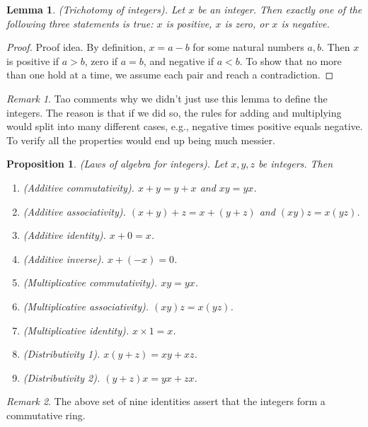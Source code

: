 \documentclass[12pt]{article}
\newtheorem{lemma}[theorem]{Lemma}
\newtheorem{proposition}[theorem]{Proposition}
\theoremstyle{definition}
\theoremstyle{remark}
\newtheorem*{remark}{Remark}
\begin{document}
\begin{lemma}
    (Trichotomy of integers). Let $x$ be an integer. Then exactly one of the following three statements is true: $x$ is positive, $x$ is zero, or $x$ is negative.
\end{lemma}

\begin{proof}
    Proof idea. By definition, $x = a-b$ for some natural numbers $a,b$. Then $x$ is positive if $a > b$, zero if $a = b$, and negative if $a < b$. To show that no more than one hold at a time, we assume each pair and reach a contradiction.
\end{proof}

\begin{remark}
    Tao comments why we didn't just use this lemma to define the integers. The reason is that if we did so, the rules for adding and multiplying would split into many different cases, e.g., negative times positive equals negative. To verify all the properties would end up being much messier.
\end{remark}

\begin{proposition}
    (Laws of algebra for integers). Let $x, y, z$ be integers. Then
    \begin{enumerate}
        \item (Additive commutativity). $x + y = y + x$ and $xy = yx$.
        \item (Additive associativity). $(x + y) + z = x + (y + z)$ and $(xy)z = x(yz)$.
        \item (Additive identity). $x + 0 = x$.
        \item (Additive inverse). $x + (-x) = 0$.
        \item (Multiplicative commutativity). $xy = yx$.
        \item (Multiplicative associativity). $(xy)z = x(yz)$.
        \item (Multiplicative identity). $x \times 1 = x$.
        \item (Distributivity 1). $x(y + z) = xy + xz$.
        \item (Distributivity 2). $(y + z)x = yx + zx$.
    \end{enumerate}
\end{proposition}

\begin{remark}
    The above set of nine identities assert that the integers form a commutative ring.
\end{remark}
\end{document}
